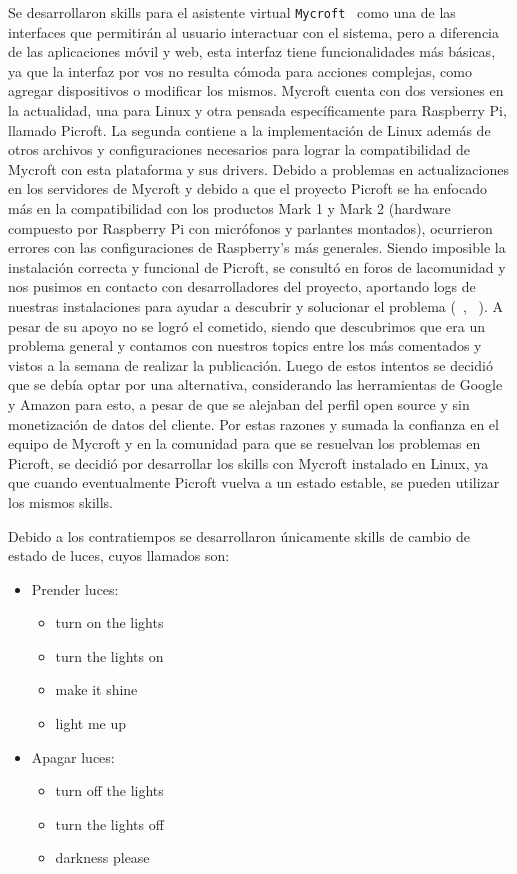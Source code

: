 Se desarrollaron skills para el asistente virtual \lstinline[columns=fixed]{Mycroft}~\cite{Mycroft} como una de las interfaces que permitirán al usuario interactuar con el sistema, pero a diferencia de las aplicaciones móvil y web, esta interfaz tiene funcionalidades más básicas, ya que la interfaz por vos no resulta cómoda para acciones complejas, como agregar dispositivos o modificar los mismos.
Mycroft cuenta con dos versiones en la actualidad, una para Linux y otra pensada específicamente para Raspberry Pi, llamado Picroft. La segunda contiene a la implementación de Linux además de otros archivos y configuraciones necesarios para lograr la compatibilidad de Mycroft con esta plataforma y sus drivers.
Debido a problemas en actualizaciones en los servidores de Mycroft y debido a que el proyecto Picroft se ha enfocado más en la compatibilidad con los productos Mark 1 y Mark 2 (hardware compuesto por Raspberry Pi con micrófonos y parlantes montados), ocurrieron errores con las configuraciones de Raspberry's más generales.
Siendo imposible la instalación correcta y funcional de Picroft, se consultó en foros de lacomunidad y nos pusimos en contacto con desarrolladores del proyecto, aportando logs de nuestras instalaciones para ayudar a descubrir y solucionar el problema (~\cite{Topic1}, ~\cite{Topic2}).
A pesar de su apoyo no se logró el cometido, siendo que descubrimos que era un problema general y contamos con nuestros topics entre los más comentados y vistos a la semana de realizar la publicación.
Luego de estos intentos se decidió que se debía optar por una alternativa, considerando las herramientas de Google y Amazon para esto, a pesar de que se alejaban del perfil open source y sin monetización de datos del cliente. Por estas razones y sumada la confianza en el equipo de Mycroft y en la comunidad para que se resuelvan los problemas en Picroft, se decidió por desarrollar los skills con Mycroft instalado en Linux, ya que cuando eventualmente Picroft vuelva a un estado estable, se pueden utilizar los mismos skills.

Debido a los contratiempos se desarrollaron únicamente skills de cambio de estado de luces, cuyos llamados son:
\begin{itemize}
  \item Prender luces:
    \begin{itemize}
      \item turn on the lights
      \item turn the lights on
      \item make it shine
      \item light me up
    \end{itemize}
  \item Apagar luces:
    \begin{itemize}
      \item turn off the lights
      \item turn the lights off
      \item darkness please
    \end{itemize}
\end{itemize}


